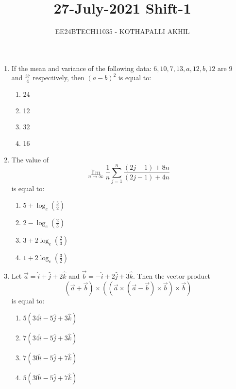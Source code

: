 \documentclass[journal]{IEEEtran}
\numberwithin{figure}{enumi}
\begin{document}


\title{27-July-2021 Shift-1}
\author{EE24BTECH11035 - KOTHAPALLI AKHIL}
{\let\newpage\relax\maketitle}


\begin{enumerate}

\item
If the mean and variance of the following data:  
$ 6, 10, 7, 13, a, 12, b, 12 $  
are $ 9 $ and $ \frac{37}{4} $ respectively, then $ (a - b)^2 $ is equal to:
\begin{enumerate}
    \item 24 
    \item 12
    \item 32
    \item 16
\end{enumerate}

\item
The value of  
\begin{equation*}
\lim_{n \to \infty} \frac{1}{n} \sum_{j=1}^{n} \frac{(2j - 1) + 8n}{(2j-1)+4n}
\end{equation*}
is equal to:
\begin{enumerate}
    \item $5 + \log_e \left(\frac{3}{2}\right)$
    \item $2 - \log_e \left(\frac{2}{3}\right)$
    \item $3 + 2 \log_e \left(\frac{2}{3}\right)$
    \item $1 + 2 \log_e \left(\frac{3}{2}\right)$
\end{enumerate}

\item
Let $ \vec{a} = \hat{i} + \hat{j} + 2\hat{k} $ and $ \vec{b} = -\hat{i} + 2\hat{j} + 3\hat{k} $. Then the vector product
\begin{equation*}
    (\vec{a} + \vec{b}) \times \left( \left( \vec{a}\times(\vec{a} - \vec{b}) \times \vec{b} \right) \times \vec{b} \right)
\end{equation*}
is equal to:
\begin{enumerate}
    \item $5(34\hat{i} - 5\hat{j} + 3\hat{k})$
    \item $7(34\hat{i} - 5\hat{j} + 3\hat{k})$
    \item $7(30\hat{i} - 5\hat{j} + 7\hat{k})$
    \item $5(30\hat{i} - 5\hat{j} + 7\hat{k})$
\end{enumerate}


\end{enumerate}
\end{document}
